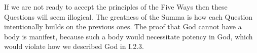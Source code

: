 \documentclass{ucetd}
\begin{document}
If we are not ready to accept the principles of the Five Ways then these Questions will seem illogical. The greatness of the Summa is how each Question intentionally builds on the previous ones. The proof that God cannot have a body is manifest, because such a body would necessitate potency in God, which would violate how we described God in I.2.3.
\end{document}
